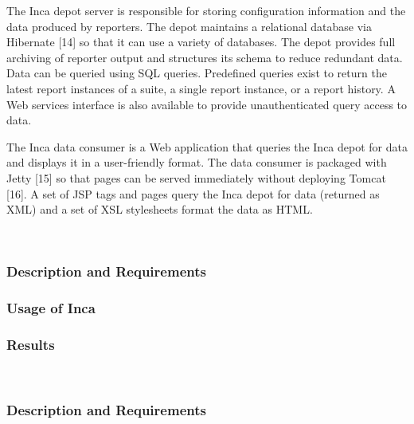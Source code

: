 \documentclass[times,10pt,twocolumn]{article}
\begin{document}

The Inca depot server is responsible for storing configuration information
and the data produced by reporters. The depot maintains a relational
database via Hibernate [14] so that it can use a variety of databases.  The
depot provides full archiving of reporter output and structures its schema
to reduce redundant data.  Data can be queried using SQL queries. Predefined
queries exist to return the latest report instances of a suite, a single
report instance, or a report history.  A Web services interface is also
available to provide unauthenticated query access to data.  



The Inca data consumer is a Web application that queries the Inca depot for
data and displays it in a user-friendly format.  The data consumer is
packaged with Jetty [15] so that pages can be served immediately without
deploying Tomcat [16].  A set of JSP tags and pages query the Inca depot for
data (returned as XML) and a set of XSL stylesheets format the data as HTML.

~\newpage
~\newpage
~\newpage
~\newpage

\label{usecases}


\subsubsection{Description and Requirements}


\subsubsection{Usage of Inca}


\subsubsection{Results}


~\newpage


\subsubsection{Description and Requirements}
\end{document}
